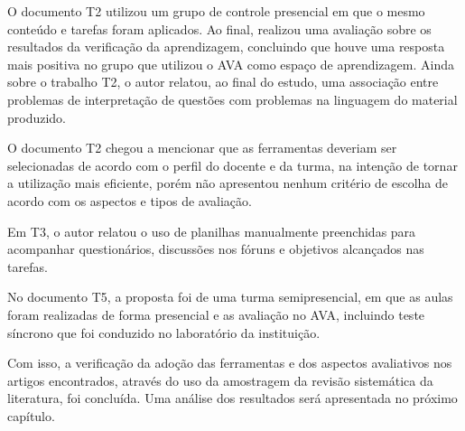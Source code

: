 O documento T2 utilizou um grupo de controle presencial em que o mesmo conteúdo e tarefas foram aplicados. Ao final, realizou uma avaliação sobre os resultados da verificação da aprendizagem, concluindo que houve uma resposta mais positiva no grupo que utilizou o AVA como espaço de aprendizagem. Ainda sobre o trabalho T2, o autor relatou, ao final do estudo, uma associação entre problemas de interpretação de questões com problemas na linguagem do material produzido.

O documento T2 chegou a mencionar que as ferramentas deveriam ser selecionadas de acordo com o perfil do docente e da turma, na intenção de tornar a utilização mais eficiente, porém não apresentou nenhum critério de escolha de acordo com os aspectos e tipos de avaliação.

Em T3, o autor relatou o uso de planilhas manualmente preenchidas para acompanhar questionários, discussões nos fóruns e objetivos alcançados nas tarefas.

No documento T5, a proposta foi de uma turma semipresencial, em que as aulas foram realizadas de forma presencial e as avaliação no AVA, incluindo teste síncrono que foi conduzido no laboratório da instituição.

Com isso, a verificação da adoção das ferramentas e dos aspectos avaliativos nos artigos encontrados, através do uso da amostragem da revisão sistemática da literatura, foi concluída. Uma análise dos resultados será apresentada no próximo capítulo.

